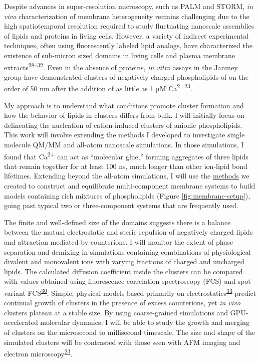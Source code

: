 \documentclass[11pt,notitlepage]{article}
\begin{document}
Despite advances in super-resolution microscopy, such as PALM and STORM,
\emph{in vivo} characterization of membrane heterogeneity remains
challenging due to the high spatiotemporal resolution required to study
fluctuating nanoscale assemblies of lipids and proteins in living cells.
However, a variety of indirect experimental techniques, often using
fluorescently labeled lipid analogs, have characterized the existence of
sub-micron sized domains in living cells and plasma membrane
extracts\textsuperscript{\protect\hyperlink{ref-GGtK2c0N}{28}--\protect\hyperlink{ref-aiu6Tmil}{32}}.
Even in the absence of proteins, \emph{in vitro} assays in the Janmey
group have demonstrated clusters of negatively charged phospholipids of
on the order of 50 nm after the addition of as little as 1 μM
Ca\textsuperscript{2+}\textsuperscript{\protect\hyperlink{ref-LhOwGz4k}{23}}.

My approach is to understand what conditions promote cluster formation
and how the behavior of lipids in clusters differs from bulk. I will
initially focus on delineating the nucleation of cation-induced clusters
of anionic phospholipids. This work will involve extending the methods I
developed to investigate single molecule QM/MM and all-atom nanoscale
simulations. In those simulations, I found that Ca\textsuperscript{2+}
can act as ``molecular glue,'' forming aggregates of three lipids that
remain together for at least 100 ns, much longer than other ion-lipid
bond lifetimes. Extending beyond the all-atom simulations, I will use
the \href{https://github.com/biophyscode}{methods} we created to
construct and equilibrate multi-component membrane systems to build
models containing rich mixtures of phospholipids (Figure
\ref{fig:membrane-setup}), going past typical two or three-component
systems that are frequently used.

The finite and well-defined size of the domains suggests there is a
balance between the mutual electrostatic and steric repulsion of
negatively charged lipids and attraction mediated by counterions. I will
monitor the extent of phase separation and demixing in simulations
containing combinations of physiological divalent and monovalent ions
with varying fractions of charged and uncharged lipids. The calculated
diffusion coefficient inside the clusters can be compared with values
obtained using fluorescence correlation spectroscopy (FCS) and spot
variant FCS\textsuperscript{\protect\hyperlink{ref-oBaB5Z87}{30}}.
Simple, physical models based primarily on
electrostatics\textsuperscript{\protect\hyperlink{ref-10CqL9t0a}{33}}
predict continual growth of clusters in the presence of excess
counterions, yet \emph{in vivo} clusters plateau at a stable size. By
using coarse-grained simulations and GPU-accelerated molecular dynamics,
I will be able to study the growth and merging of clusters on the
microsecond to millisecond timescale. The size and shape of the
simulated clusters will be contrasted with those seen with AFM imaging
and electron
microscopy\textsuperscript{\protect\hyperlink{ref-LhOwGz4k}{23}}.
\end{document}
